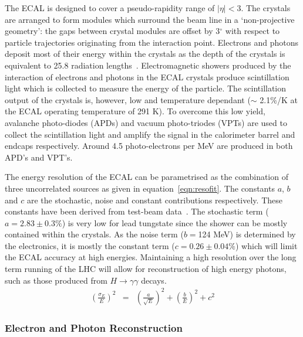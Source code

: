 The ECAL is designed to cover a pseudo-rapidity range of $|\eta | < 3$. 
The crystals are arranged to form modules which surround the beam line in a `non-projective geometry':
the gaps between crystal modules are offset by 3$^{\circ}$ with respect to particle trajectories originating from 
the interaction point. Electrons and photons deposit most of their energy within 
the crystals as the depth of the crystals is equivalent to 25.8 radiation lengths~\citep{TDR1}. 
Electromagnetic showers produced by the interaction of electrons and photons in the ECAL crystals
produce scintillation light which is collected to measure the energy of the particle. 
The scintillation output of the crystals is, however, low and temperature dependant 
($\sim$ 2.1\%/K at the ECAL operating temperature of 291 K). 
To overcome this low yield, avalanche photo-diodes (APDs) and vacuum 
photo-triodes (VPTs) are used to collect the scintillation light and amplify the signal in the 
calorimeter barrel and endcaps respectively. Around 4.5 photo-electrons per MeV are produced in both 
APD's and VPT's. 

The energy resolution of the ECAL can be parametrised as the combination of three 
uncorrelated sources as given in equation~\ref{eqn:resofit}.
The constants $a$, $b$ and $c$ are the stochastic, noise and constant contributions respectively. 
These constants have been derived from test-beam data~\citep{AN-06-140}.
The stochastic term ($a=2.83\pm0.3\%$) is very low for lead tungstate since the shower 
can be mostly contained within the crystals.
As the noise term ($b=$124 MeV) is determined by the electronics, 
it is mostly the constant term ($c=0.26\pm0.04\%$) which will limit the ECAL accuracy at 
high energies. Maintaining a high resolution 
over the long term running of the LHC will allow for reconstruction of high energy photons, 
such as those produced from $H \rightarrow \gamma\gamma$ decays.
\begin{eqnarray}
\left( \frac{\displaystyle \sigma_{E}}{\displaystyle E} \right)^ 2 
	& = & \left( \frac{\displaystyle a}{\displaystyle \sqrt{E}} \right)^ 2 
  	+ \left( \frac{\displaystyle b}{\displaystyle {E}} \right)^ 2 + c^ 2
\label{eqn:resofit}
\end{eqnarray}


\subsubsection{Electron and Photon Reconstruction}

